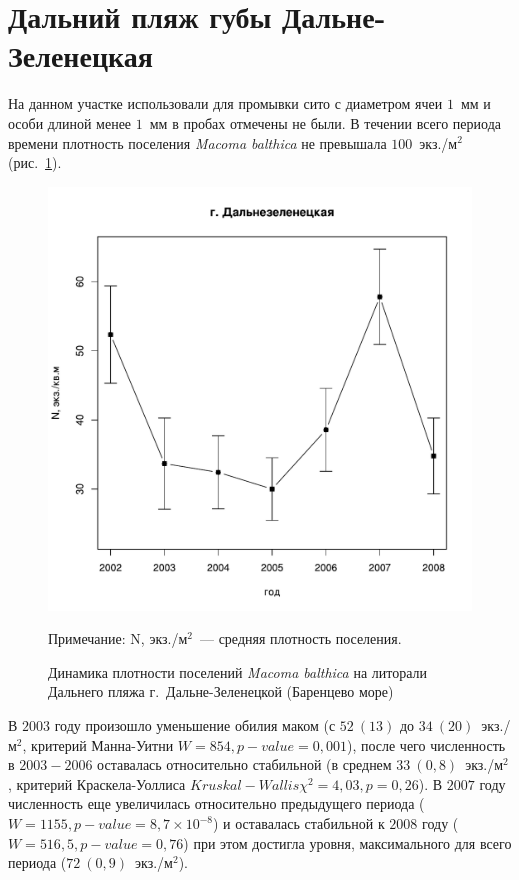 		\section{Дальний пляж губы Дальне-Зеленецкая}
На данном участке использовали для промывки сито с диаметром ячеи $1$~мм и особи длиной менее $1$~мм в пробах отмечены не были. 
В течении всего периода времени плотность поселения {\it Macoma balthica} не превышала $100$~экз./м$^2$  (рис.~\ref{ris:dynamic_Zelency}). 
	\begin{figure}[p]
		\includegraphics{../Barenc_Sea/Dalnezeleneckaya/N_dynamic1.pdf}
	\caption{Динамика плотности поселений {\it Macoma balthica} на литорали Дальнего пляжа г.~Дальне-Зеленецкой (Баренцево море)}
{\footnotesize Примечание: N, экз./м$^2$~--- средняя плотность поселения.}
	\label{ris:dynamic_Zelency}
	\end{figure}

В $2003$ году произошло уменьшение обилия маком (с $52~(13)$ до $34~(20)$~экз./м$^2$, критерий Манна-Уитни  $W = 854, p-value = 0,001$), после чего численность  в $2003 - 2006$ оставалась относительно стабильной (в среднем $33~(0,8)$~экз./м$^2$, критерий Краскела-Уоллиса $Kruskal-Wallis \chi^2 = 4,03, p = 0,26$). 
В $2007$ году численность еще увеличилась относительно предыдущего периода ($W = 1155, p-value = 8,7 \times 10^{-8}$) и оставалась стабильной к $2008$ году ($W = 516,5, p-value = 0,76$) при этом достигла уровня, максимального для всего периода ($72~(0,9)$~экз./м$^2$).

